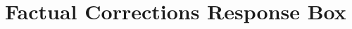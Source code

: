 \documentclass[11pt]{extarticle}
\begin{document}








\section{Factual Corrections Response Box}
\end{document}
